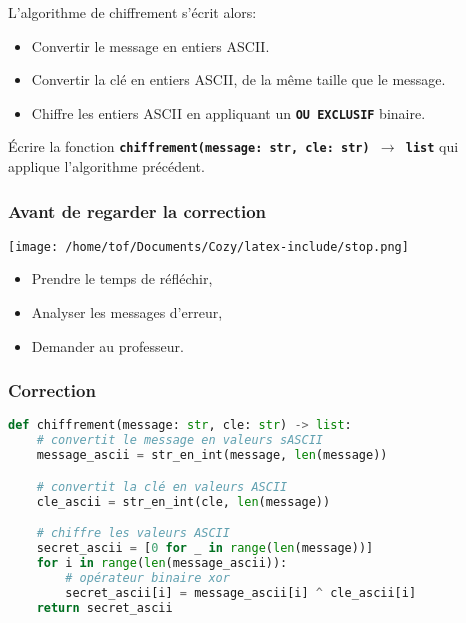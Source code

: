 \documentclass[svgnames,11pt]{beamer}
\begin{document}
\begin{frame}
    \frametitle{}

    L'algorithme de chiffrement s'écrit alors:
    \begin{itemize}
        \item Convertir le message en entiers ASCII.
        \item Convertir la clé en entiers ASCII, de la même taille que le message.
        \item Chiffre les entiers ASCII en appliquant un \textbf{\texttt{OU EXCLUSIF}} binaire.
    \end{itemize}
\begin{activite}
Écrire la fonction \textbf{\texttt{chiffrement(message: str, cle: str) $\rightarrow$ list}} qui applique l'algorithme précédent.
\end{activite}
\end{frame}
\begin{frame}
    \frametitle{Avant de regarder la correction}
\begin{center}
    \centering
    \texttt{[image: /home/tof/Documents/Cozy/latex-include/stop.png]}
    \end{center}
{\Large
    \begin{itemize}
        \item Prendre le temps de réfléchir,
        \item Analyser les messages d'erreur,
        \item Demander au professeur.
    \end{itemize}
}
\end{frame}
\begin{frame}[fragile]
    \frametitle{Correction}
\begin{center}
\begin{lstlisting}[language=Python , basicstyle=\ttfamily\small, xleftmargin=0.2em, xrightmargin=-2.5em]
def chiffrement(message: str, cle: str) -> list:
    # convertit le message en valeurs sASCII
    message_ascii = str_en_int(message, len(message))

    # convertit la clé en valeurs ASCII
    cle_ascii = str_en_int(cle, len(message))

    # chiffre les valeurs ASCII
    secret_ascii = [0 for _ in range(len(message))]
    for i in range(len(message_ascii)):
        # opérateur binaire xor
        secret_ascii[i] = message_ascii[i] ^ cle_ascii[i]
    return secret_ascii
\end{lstlisting}
\end{center}
    

\end{frame}
\end{document}
